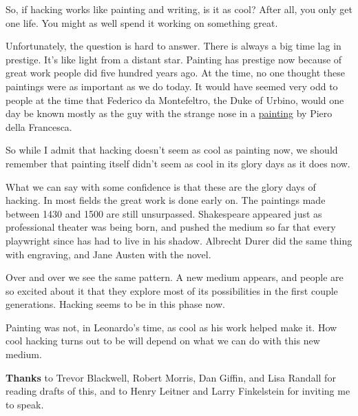 So, if hacking works like painting and writing, is it as cool? After
all, you only get one life. You might as well spend it working on
something great.

Unfortunately, the question is hard to answer. There is always a big
time lag in prestige. It's like light from a distant star. Painting has
prestige now because of great work people did five hundred years ago. At
the time, no one thought these paintings were as important as we do
today. It would have seemed very odd to people at the time that Federico
da Montefeltro, the Duke of Urbino, would one day be known mostly as the
guy with the strange nose in a \href{montefeltro.html}{painting} by
Piero della Francesca.

So while I admit that hacking doesn't seem as cool as painting now, we
should remember that painting itself didn't seem as cool in its glory
days as it does now.

What we can say with some confidence is that these are the glory days of
hacking. In most fields the great work is done early on. The paintings
made between 1430 and 1500 are still unsurpassed. Shakespeare appeared
just as professional theater was being born, and pushed the medium so
far that every playwright since has had to live in his shadow. Albrecht
Durer did the same thing with engraving, and Jane Austen with the novel.

Over and over we see the same pattern. A new medium appears, and people
are so excited about it that they explore most of its possibilities in
the first couple generations. Hacking seems to be in this phase now.

Painting was not, in Leonardo's time, as cool as his work helped make
it. How cool hacking turns out to be will depend on what we can do with
this new medium.


\textbf{Thanks} to Trevor Blackwell, Robert Morris, Dan Giffin, and Lisa
Randall for reading drafts of this, and to Henry Leitner and Larry
Finkelstein for inviting me to speak.